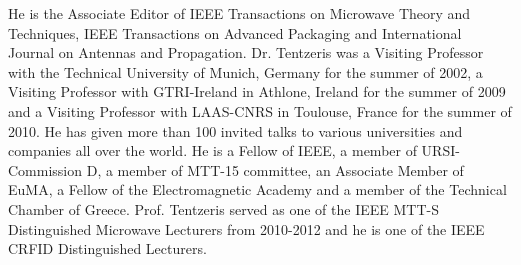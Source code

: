 \documentclass[journal]{IEEEtran}
\begin{document}
\begin{IEEEbiography}
He is the Associate Editor of IEEE Transactions on Microwave Theory and Techniques, IEEE Transactions on Advanced Packaging and International Journal on Antennas and Propagation. 
Dr. Tentzeris was a Visiting Professor with the Technical University of Munich, Germany for the summer of 2002, a Visiting Professor with GTRI-Ireland in Athlone, Ireland for the summer of 2009 and a Visiting Professor with LAAS-CNRS in Toulouse, France for the summer of 2010. He has given more than 100 invited talks to various universities and companies all over the world. He is a Fellow of IEEE, a member of URSI-Commission D, a member of MTT-15 committee, an Associate Member of EuMA, a Fellow of the Electromagnetic Academy and a member of the Technical Chamber of Greece. Prof. Tentzeris served as one of the IEEE MTT-S Distinguished Microwave Lecturers from 2010-2012 and he is one of the IEEE CRFID Distinguished Lecturers.
\end{IEEEbiography}





\end{document}
